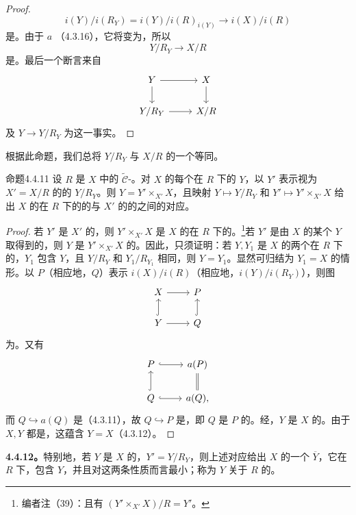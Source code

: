 \begin{proof}
\[
i(Y)/i(R_Y)=i(Y)/i(R)_{i(Y)}\longrightarrow i(X)/i(R)
\]
是。由于 $a$ （4.3.16），它将变为，所以
\[
Y/R_Y\longrightarrow X/R
\]
是。最后一个断言来自
\[
\begin{tikzcd}
Y\arrow[r]\arrow[d]&X\arrow[d]\\
Y/R_Y\arrow[r]&X/R
\end{tikzcd}
\]
及 $Y\to Y/R_Y$ 为这一事实。
\end{proof}
根据此命题，我们总将 $Y/R_Y$ 与 $X/R$ 的一个等同。
\begin{SGAresult}{命题}{4.4.11}
设 $R$ 是 $X$ 中的 $\widetilde{\mathcal C}$-。对 $X$ 的每个在 $R$ 下的 $Y$，以 $Y'$ 表示视为 $X'=X/R$ 的的 $Y/R_Y$。则 $Y=Y'\times_{X'}X$，且映射 $Y\mapsto Y/R_Y$ 和 $Y'\mapsto Y'\times_{X'}X$ 给出 $X$ 的在 $R$ 下的的与 $X'$ 的的之间的对应。
\end{SGAresult}
\begin{proof}
若 $Y'$ 是 $X'$ 的，则 $Y'\times_{X'}X$ 是 $X$ 的在 $R$ 下的。\footnote{编者注（39）：且有 $(Y'\times_{X'}X)/R=Y'$。}若 $Y'$ 是由 $X$ 的某个 $Y$ 取得到的，则 $Y$ 是 $Y'\times_{X'}X$ 的。因此，只须证明：若 $Y,Y_1$ 是 $X$ 的两个在 $R$ 下的，$Y_1$ 包含 $Y$，且 $Y/R_Y$ 和 $Y_1/R_{Y_1}$ 相同，则 $Y=Y_1$。显然可归结为 $Y_1=X$ 的情形。以 $P$（相应地，$Q$）表示 $i(X)/i(R)$（相应地，$i(Y)/i(R_Y)$），则图
\[
\begin{tikzcd}
X\arrow[r]&P\\
Y\arrow[u,hook]\arrow[r]&Q\arrow[u,hook]
\end{tikzcd}
\]
为。又有
\[
\begin{tikzcd}
P\arrow[r,hook]&a(P)\arrow[d,equal]\\
Q\arrow[u,hook]\arrow[r,hook]&a(Q),
\end{tikzcd}
\]
而 $Q\hookrightarrow a(Q)$ 是（4.3.11），故 $Q\hookrightarrow P$ 是，即 $Q$ 是 $P$ 的。经，$Y$ 是 $X$ 的。由于 $X,Y$ 都是，这蕴含 $Y=X$（4.3.12）。
\end{proof}
\textbf{4.4.12。}特别地，若 $Y$ 是 $X$ 的，$Y'=Y/R_Y$，则上述对应给出 $X$ 的一个 $\overline Y$，它在 $R$ 下，包含 $Y$，并且对这两条性质而言最小；称为 $Y$ 关于 $R$ 的。


